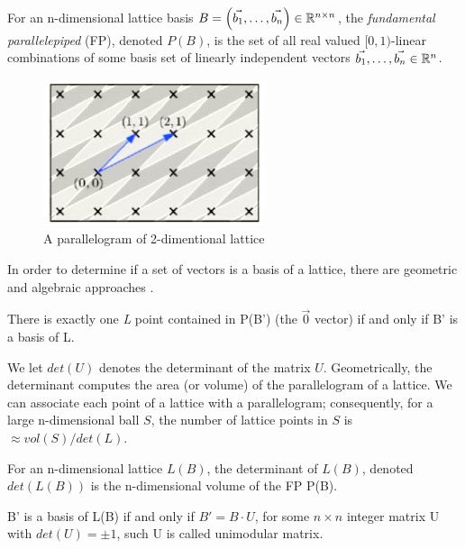 \begin{definition}
  For an n-dimensional lattice basis
  $B = \left( \vec{b_1}, \dots, \vec{b_n} \right) \in \mathbb{R}^{n \times n}$, the
  \emph{fundamental parallelepiped} (FP), denoted $P(B)$, is the set of all real
  valued $[0,1)$-linear combinations of some basis set of linearly independent
  vectors $\vec{b_1}, \dots ,\vec{b_n} \in \mathbb{R}^n$.
  \begin{figure}[h]
    \centering \includegraphics[scale=0.7]{parallelopiped}
    \caption{A parallelogram of 2-dimentional lattice}
    \label{fig:paralellopiped}
  \end{figure}
\end{definition}
In order to determine if a set of vectors is a basis of a lattice, there are
geometric and algebraic approaches \cite{micciancio2009lattice}.
\begin{lemma}
  There is exactly one \emph{L} point contained in P(B') (the $\vec{0}$ vector)
  if and only if B' is a basis of L.
  \label{lem:parallelopiped}
\end{lemma}
We let $det(U)$ denotes the determinant of the matrix $U$.  Geometrically, the
determinant computes the area (or volume) of the parallelogram of a lattice. We
can associate each point of a lattice with a parallelogram; consequently, for a
large n-dimensional ball $S$, the number of lattice points in $S$ is
$\approx vol(S) / det(L)$.
\begin{definition}[Determinant]
  \label{def:determinant}
  For an n-dimensional lattice $L(B)$, the determinant of $L(B)$, denoted
  $det(L(B))$ is the n-dimensional volume of the FP P(B).
\end{definition}

\begin{lemma}
  B' is a basis of L(B) if and only if $B'=B \cdot U$, for some $n \times n$ integer
  matrix U with $det(U) = \pm 1$, such U is called unimodular matrix.
  \label{lem:detBasis}
\end{lemma}

